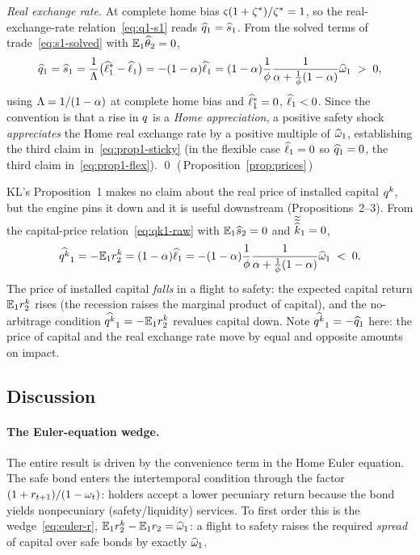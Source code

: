 \emph{Real exchange rate.} At complete home bias $\varsigma(1+\zeta^{*})/\zeta^{*}=1$, so the
real-exchange-rate relation~\eqref{eq:q1-s1} reads $\widehat{q}_1=\widehat{s}_1$.
From the solved terms of trade~\eqref{eq:s1-solved} with $\mathbb{E}_1\widehat{\theta}_2=0$,
\begin{equation}
\widehat{q}_1 = \widehat{s}_1 = \frac{1}{\Lambda}\bigl(\widehat{\ell}^{*}_1-\widehat{\ell}_1\bigr)
= -(1-\alpha)\widehat{\ell}_1
= (1-\alpha)\frac{1}{\phi}\frac{1}{\alpha+\frac{1}{\phi}(1-\alpha)}\widehat{\omega}_1 \;>\;0, \label{eq:prop1b-q}
\end{equation}
using $\Lambda=1/(1-\alpha)$ at complete home bias and $\widehat{\ell}^{*}_1=0$,
$\widehat{\ell}_1<0$. Since the convention is that a rise in $q$ is a \emph{Home
appreciation}, a positive safety shock \emph{appreciates} the Home real exchange
rate by a positive multiple of $\widehat{\omega}_1$, establishing the third claim
in~\eqref{eq:prop1-sticky} (in the flexible case $\widehat{\ell}_1=0$ so
$\widehat{q}_1=0$, the third claim in~\eqref{eq:prop1-flex}). \qed
(\,Proposition~\ref{prop:prices}\,)

\begin{remark}
KL's Proposition~1 makes no claim about the real price of installed capital
$q^{k}$, but the engine pins it down and it is useful downstream (Propositions~2--3).
From the capital-price relation~\eqref{eq:qk1-raw} with $\mathbb{E}_1\widehat{s}_2=0$ and
$\widetilde{\widetilde{\widehat{k}}}_1=0$,
\begin{equation}
\widehat{q^{k}}_1 = -\mathbb{E}_1r^{k}_2 = (1-\alpha)\widehat{\ell}_1
= -(1-\alpha)\frac{1}{\phi}\frac{1}{\alpha+\frac{1}{\phi}(1-\alpha)}\widehat{\omega}_1 \;<\;0. \label{eq:prop1b-qk}
\end{equation}
The price of installed capital \emph{falls} in a flight to safety: the expected
capital return $\mathbb{E}_1r^{k}_2$ rises (the recession raises the marginal product of
capital), and the no-arbitrage condition $\widehat{q^{k}}_1=-\mathbb{E}_1r^{k}_2$ revalues
capital down. Note $\widehat{q^{k}}_1=-\widehat{q}_1$ here: the price of capital and the
real exchange rate move by equal and opposite amounts on impact.
\end{remark}

\subsection{Discussion}

\paragraph{The Euler-equation wedge.} The entire result is driven by the
convenience term in the Home Euler equation. The safe bond enters the
intertemporal condition through the factor $(1+r_{t+1})/(1-\omega_t)$: holders accept
a lower pecuniary return because the bond yields nonpecuniary (safety/liquidity)
services. To first order this is the wedge~\eqref{eq:euler-r},
$\mathbb{E}_1r^{k}_2-\mathbb{E}_1r_2=\widehat{\omega}_1$: a flight to safety raises the required
\emph{spread} of capital over safe bonds by exactly $\widehat{\omega}_1$.

